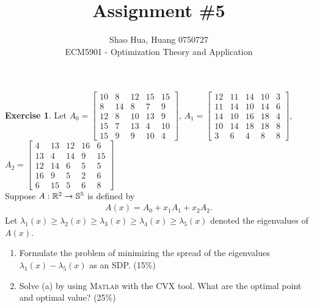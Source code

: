 \documentclass[12pt]{extarticle}
\title{Assignment \#5}
\author{Shao Hua, Huang 0750727\\
ECM5901 - Optimization Theory and Application}
\theoremstyle{definition}
\newtheorem{exercise}{Exercise}
\begin{document}
\maketitle

\begin{exercise}
  Let $A_0=\begin{bmatrix}10&8&12&15&15\\8&14&8&7&9\\12&8&10&13&9\\15&7&13&4&10\\15&9&9&10&4\end{bmatrix}$,
      $A_1=\begin{bmatrix}12&11&14&10&3\\11&14&10&14&6\\14&10&16&18&4\\10&14&18&18&8\\3&6&4&8&8\end{bmatrix}$,\\
      $A_2=\begin{bmatrix}4&13&12&16&6\\13&4&14&9&15\\12&14&6&5&5\\16&9&5&2&6\\6&15&5&6&8\end{bmatrix}$\\
  Suppose $A:\mathbb{R}^2\rightarrow\mathbb{S}^5$ is defined by
  \begin{align*}
    A(x)=A_0+x_1A_1+x_2A_2.
  \end{align*}
  Let $\lambda_1(x)\ge\lambda_2(x)\ge\lambda_3(x)\ge\lambda_4(x)\ge\lambda_5(x)$ denoted the eigenvalues of $A(x)$.
  \begin{enumerate}[label=(\alph*)]
    \item Formulate the problem of minimizing the spread of the eigenvalues $\lambda_1(x)-\lambda_5(x)$ as an SDP. (15\%)
    \item Solve (a) by using \textsc{Matlab} with the CVX tool. What are the optimal point and optimal value? (25\%)
  \end{enumerate}
\end{exercise}
\end{document}
